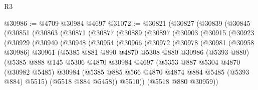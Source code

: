 \begin{lexlean}{R3}
\begin{coremodule}
@30986 := @4709 @30984 @4697
@31072 := @30821
    (@30827
      (@30839
        (@30845
          (@30851
            (@30863
              (@30871
                (@30877
                  (@30889
                    (@30897
                      (@30903
                        (@30915
                          (@30923
                            (@30929
                              (@30940
                                (@30948
                                  (@30954
                                    (@30966
                                      (@30972
                                        (@30978
                                          (@30981
                                            (@30958 @30986)
                                            @30961
                                            (@5385
                                              @881
                                              @890
                                              @4870
                                              @5308
                                              @880
                                              @30986
                                              (@5393 @880)
                                              (@5385
                                                @888
                                                @145
                                                @5306
                                                @4870
                                                @30984
                                                @4697
                                                (@5353
                                                  @887
                                                  @5304
                                                  @4870
                                                  (@30982 @5485)
                                                  @30984
                                                  (@5385
                                                    @885
                                                    @566
                                                    @4870
                                                    @4874
                                                    @884
                                                    @5485
                                                    (@5393 @884)
                                                    @5515)
                                                  (@5518 @884 @5458))
                                                @5510))
                                            (@5518 @880 @30959))

\end{coremodule}
\end{lexlean}
